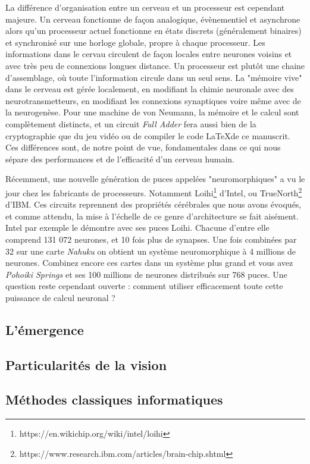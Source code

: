 	La différence d'organisation entre un cerveau et un processeur est cependant majeure. Un cerveau fonctionne de façon analogique, évènementiel et asynchrone alors qu'un processeur actuel fonctionne en états discrets (généralement binaires) et synchronisé sur une horloge globale, propre à chaque processeur. Les informations dans le cervau circulent de façon locales entre neurones voisins et avec très peu de connexions longues distance. Un processeur est plutôt une chaine d'assemblage, où toute l'information circule dans un seul sens. La "mémoire vive" dans le cerveau est gérée localement, en modifiant la chimie neuronale avec des neurotransmetteurs, en modifiant les connexions synaptiques voire même avec de la neurogenèse. Pour une machine de von Neumann, la mémoire et le calcul sont complètement distincts, et un circuit \textit{Full Adder} fera aussi bien de la cryptographie que du jeu vidéo ou de compiler le code \LaTeX de ce manuscrit. Ces différences sont, de notre point de vue, fondamentales dans ce qui nous sépare des performances et de l'efficacité d'un cerveau humain.

	Récemment, une nouvelle génération de puces appelées "neuromorphiques" a vu le jour chez les fabricants de processeurs. Notamment Loihi\footnote{https://en.wikichip.org/wiki/intel/loihi} d'Intel, ou TrueNorth\footnote{https://www.research.ibm.com/articles/brain-chip.shtml} d'IBM. Ces circuits reprennent des propriétés cérébrales que nous avons évoqués, et comme attendu, la mise à l'échelle de ce genre d'architecture se fait aisément. Intel par exemple le démontre avec ses puces Loihi. Chacune d'entre elle comprend 131 072 neurones, et 10 fois plus de synapses. Une fois combinées par 32 sur une carte \textit{Nahuku} on obtient un système neuromorphique à 4 millions de neurones. Combinez encore ces cartes dans un système plus grand et vous avez \textit{Pohoiki Springs} et ses 100 millions de neurones distribués sur 768 puces. Une question reste cependant ouverte : comment utiliser efficacement toute cette puissance de calcul neuronal ?

\subsection{L'émergence}

	

\subsection{Particularités de la vision}
\subsection{Méthodes classiques informatiques}
